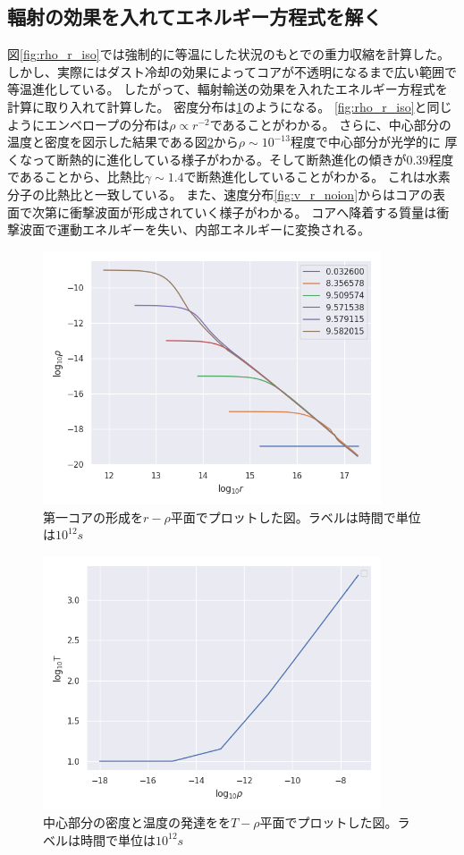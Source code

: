 \documentclass[a4j, dvipdfmx]{jsarticle}
\begin{document}
\subsection{輻射の効果を入れてエネルギー方程式を解く}
図\ref{fig:rho_r_iso}では強制的に等温にした状況のもとでの重力収縮を計算した。
しかし、実際にはダスト冷却の効果によってコアが不透明になるまで広い範囲で等温進化している。
したがって、輻射輸送の効果を入れたエネルギー方程式を計算に取り入れて計算した。
密度分布は\ref{fig:rho_r_noion}のようになる。
\ref{fig:rho_r_iso}と同じようにエンベロープの分布は$\rho \propto r^{-2}$であることがわかる。
さらに、中心部分の温度と密度を図示した結果である図\ref{fig:core_noion}から$\rho \sim 10^{-13}$程度で中心部分が光学的に
厚くなって断熱的に進化している様子がわかる。そして断熱進化の傾きが$0.39$程度であることから、比熱比$\gamma \sim 1.4$で断熱進化していることがわかる。
これは水素分子の比熱比と一致している。
また、速度分布\ref{fig:v_r_noion}からはコアの表面で次第に衝撃波面が形成されていく様子がわかる。
コアへ降着する質量は衝撃波面で運動エネルギーを失い、内部エネルギーに変換される。
\begin{figure}[H]
    \includegraphics[clip,width=10.0cm]{graph/rho_r_noion.png}
    \caption{第一コアの形成を$r-\rho$平面でプロットした図。ラベルは時間で単位は$10^{12}s$}
    \label{fig:rho_r_noion}
\end{figure}
\begin{figure}[H]
    \includegraphics[clip,width=10.0cm]{graph/core_noion.png}
    \caption{中心部分の密度と温度の発達をを$T-\rho$平面でプロットした図。ラベルは時間で単位は$10^{12}s$}
    \label{fig:core_noion}
\end{figure}
\end{document}

